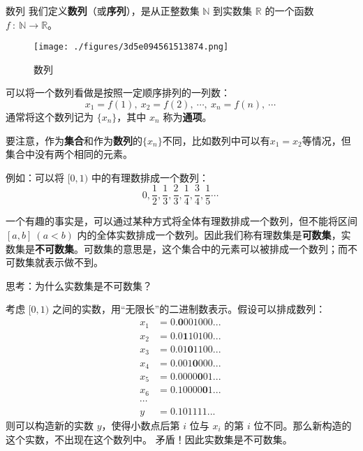 
\begin{issues}
\issueTODO
\issueDraft
\end{issues}

\begin{definition}{数列}
我们定义\textbf{数列}（或\textbf{序列}），是从正整数集 $\mathbb{N}$  到实数集 $\mathbb{R}$ 的一个函数 $f\ :\ \mathbb{N}\rightarrow \mathbb{R}$。
\end{definition}
\begin{figure}[ht]
\centering
\texttt{[image: ./figures/3d5e094561513874.png]}
\caption{数列} \label{fig_seq_1}
\end{figure}

可以将一个数列看做是按照一定顺序排列的一列数：
\begin{equation}
x_1=f(1),\ x_2=f(2),\ \cdots,\ x_n=f(n),\ \cdots~
\end{equation}
通常将这个数列记为 $\{x_n\}$，其中 $x_n$ 称为\textbf{通项}。

要注意，作为\textbf{集合}和作为\textbf{数列}的$\{x_n\}$不同，比如数列中可以有$x_1=x_2$等情况，但集合中没有两个相同的元素。

例如：可以将 $[0,1)$ 中的有理数排成一个数列：
\begin{equation}
0,\frac{1}{2},\frac{1}{3},\frac{2}{3},\frac{1}{4},\frac{3}{4},\frac{1}{5}\cdots~
\end{equation}

一个有趣的事实是，可以通过某种方式将全体有理数排成一个数列，但不能将区间 $[a,b]\ (a<b)$ 内的全体实数排成一个数列。因此我们称有理数集是\textbf{可数集}，实数集是\textbf{不可数集}。可数集的意思是，这个集合中的元素可以被排成一个数列；而不可数集就表示做不到。

\begin{example}{}
思考：为什么实数集是不可数集？

考虑 $[0,1)$ 之间的实数，用“无限长”的二进制数表示。假设可以排成数列： 
\begin{equation}
\begin{aligned}
x_1&=0.\boldsymbol 0001000...\\
x_2&=0.0\boldsymbol 110100...\\
x_3&=0.01\boldsymbol 01100...\\
x_4&=0.001\boldsymbol 0000...\\
x_5&=0.0000\boldsymbol 001...\\
x_6&=0.10000\boldsymbol 01...\\
\cdots
\\
y&=0.101111...
\end{aligned}~
\end{equation}
则可以构造新的实数 $y$，使得小数点后第 $i$ 位与 $x_i$ 的第 $i$ 位不同。那么新构造的这个实数，不出现在这个数列中。
矛盾！因此实数集是不可数集。
\end{example}

​		

​		
